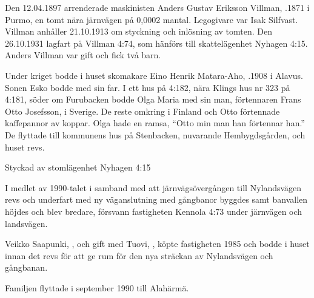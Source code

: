 Den 12.04.1897 arrenderade maskinisten Anders Gustav Eriksson Villman, .1871 i Purmo, en tomt nära järnvägen på 0,0002	mantal. Legogivare var Isak Silfvast. Villman anhåller 21.10.1913 om styckning och inlösning av tomten. Den 26.10.1931 lagfart på Villman	4:74, som hänförs till skattelägenhet Nyhagen 4:15. Anders Villman var gift och fick två barn.
\begin{jhchildren}
  \item {}
  \item {}
\end{jhchildren}
Under kriget bodde i huset skomakare Eino Henrik Matara-Aho, .1908 i Alavus. Sonen Esko bodde med sin far. I ett hus på 4:182, nära Klings hus nr 323 på 4:181, söder om Furubacken bodde Olga Maria med sin man, förtennaren Frans Otto Josefsson,  i Sverige. De reste omkring i Finland och Otto förtennade kaffepannor av koppar. Olga hade en ramsa, ``Otto min man han förtennar han.'' De flyttade till kommunens hus på Stenbacken, nuvarande Hembygdsgården, och huset revs.




Styckad av stomlägenhet Nyhagen 4:15


I medlet av 1990-talet i samband med att järnvägsövergången till Nylandsvägen revs och underfart med ny väganslutning med gångbanor byggdes samt banvallen höjdes och blev bredare, försvann fastigheten Kennola 4:73 under järnvägen och landsvägen.


Veikko Saapunki, , och gift med Tuovi, , köpte fastigheten 1985 och bodde i huset innan det revs för att ge rum för den nya sträckan av Nylandsvägen och gångbanan.
\begin{jhchildren}
  \item {}
  \item {}
\end{jhchildren}
Familjen flyttade i september 1990 till Alahärmä.


